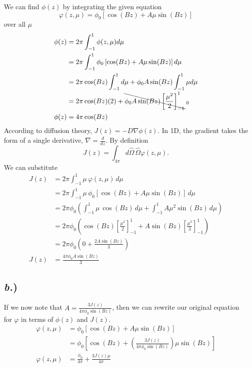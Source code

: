\documentclass{article}
\newcommand{\Oh}{\hat{\Omega}}
\begin{document}
We can find $\phi(z)$ by integrating the given equation 
$$ \varphi(z,\mu) = \phi_0 \left[\cos(Bz) + A \mu \sin(Bz)\right] $$
over all $\mu$
\begin{align*}
\phi(z)	&= 2\pi \int_{-1}^{1} \phi(z,\mu) d\mu \\
		&= 2\pi \int_{-1}^{1} \phi_0\left[\cos(Bz) + A \mu \sin(Bz)\right] d\mu \\
		&= 2\pi \cos(Bz) \int_{-1}^{1} d\mu + \phi_0 A \sin(Bz) \int_{-1}^{1} \mu d\mu\\
		&= 2\pi \cos(Bz) (2) + \bcancel{\phi_0 A \sin(Bz) \left[ \frac{\mu^2}{2} \right]_{-1}^{1}}_{\;0}\\
\phi(z)	&= 4\pi \cos(Bz)
\end{align*}
According to diffusion theory, $J(z) = -D \nabla \phi(z)$. In 1D, the gradient takes the form of a single derivative, $\nabla = \frac{d}{dz}$. By definition 
$$ J(z) = \int_{4\pi} d\Oh \, \Oh \varphi(z,\mu).$$
We can substitute 
\begin{align*}
J(z)	&= 2\pi \int_{-1}^{1} \mu \, \varphi(z,\mu) \, d\mu \\
		&= 2\pi \int_{-1}^{1} \mu \, \phi_0 \left[\cos(Bz) + A \mu \sin(Bz)\right] \, d\mu \\
		&= 2\pi\phi_0 \left( \int_{-1}^{1} \mu \, \cos(Bz) \, d\mu + \int_{-1}^{1} A \mu^2 \sin(Bz) \, d\mu \right) \\
		&= 2\pi\phi_0 \left( \cos(Bz) \left[\frac{\mu^2}{2} \right]_{-1}^{1} + A \sin(Bz) \left[ \frac{\mu^3}{3} \right]_{-1}^{1} \right) \\
		&= 2\pi\phi_0 \left( 0 + \frac{2A\sin(Bz)}{3} \right) \\
J(z)	&= \frac{4\pi\phi_0A\sin(Bz)}{3}
\end{align*}


\subsection*{\textit{b.})}

If we now note that $A = \frac{3J(z)}{4\pi\phi_0\sin(Bz)}$, then we can rewrite our original equation for $\varphi$ in terms of $\phi(z)$ and $J(z)$.
\begin{align*}
\varphi(z,\mu)	&= \phi_0 \left[\cos(Bz) + A \mu \sin(Bz)\right] \\
				&= \phi_0 \left[\cos(Bz) + \left(\frac{3J(z)}{4\pi\phi_0\sin(Bz)}\right) \mu \sin(Bz)\right]\\
\varphi(z,\mu)	&= \frac{\phi_0}{4\pi} + \frac{3J(z)\mu}{4\pi}
\end{align*}
\end{document}
